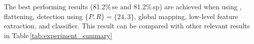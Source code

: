 

The best performing results (81.2\%\,\ac{se} and 81.2\%\,\ac{sp}) are achieved when using \nlm, flattening, \lbptop detection using $\{P,R\}= \{24,3\}$, global mapping, low-level feature extraction, and \rf classifier.
This result can be compared with other relevant results in Table\,\ref{tab:experiment_summary}





